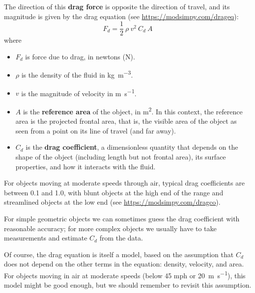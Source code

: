 \documentclass[12pt]{book}
\theoremstyle{exercise}
\begin{document}

The direction of this {\bf drag force} is opposite the direction of travel, and its magnitude is given by the drag equation (see \url{https://modsimpy.com/drageq}):
%
\[ F_d = \frac{1}{2}~\rho~v^2~C_d~A \]
%
where

\begin{itemize}

\item $F_d$ is force due to drag, in newtons (\si{\newton}).

\item $\rho$ is the density of the fluid in \si{\kg\per\meter\cubed}.

\item $v$ is the magnitude of velocity in \si{\meter\per\second}.

\item $A$ is the {\bf reference area} of the object, in \si{\meter\squared}.  In this context, the reference area is the projected frontal area, that is, the visible area of the object as seen from a point on its line of travel (and far away).


\item $C_d$ is the {\bf drag coefficient}, a dimensionless quantity that depends on the shape of the object (including length but not frontal area), its surface properties, and how it interacts with the fluid.


\end{itemize}

For objects moving at moderate speeds through air, typical drag coefficients are between 0.1 and 1.0, with blunt objects at the high end of the range and streamlined objects at the low end (see \url{https://modsimpy.com/dragco}).

For simple geometric objects we can sometimes guess the drag coefficient with reasonable accuracy; for more complex objects we usually have to take measurements and estimate $C_d$ from the data.

Of course, the drag equation is itself a model, based on the assumption that $C_d$ does not depend on the other terms in the equation: density, velocity, and area.  For objects moving in air at moderate speeds (below 45 mph or \SI{20}{\meter\per\second}), this model might be good enough, but we should remember to revisit this assumption.
\end{document}
